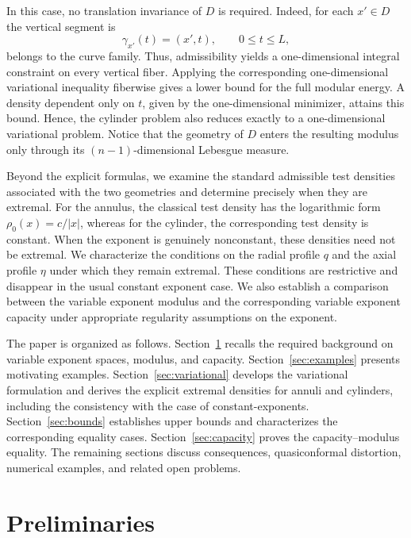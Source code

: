 \documentclass[12pt]{amsart}
\numberwithin{equation}{section}
\theoremstyle{plain}
\theoremstyle{definition}
\begin{document}
In this case, no translation invariance of $D$ is required. Indeed, for
each $x'\in D$ the vertical segment is
\begin{equation*}
\gamma_{x'}(t)=(x',t),
\qquad 0\le t\le L,
\end{equation*}
belongs to the curve family. Thus, admissibility yields a
one-dimensional integral constraint on every vertical fiber. Applying
the corresponding one-dimensional variational inequality fiberwise
gives a lower bound for the full modular energy. A density dependent
only on $t$, given by the one-dimensional minimizer, attains this
bound. Hence, the cylinder problem also reduces exactly to a
one-dimensional variational problem. Notice that the geometry of $D$
enters the resulting modulus only through its $(n-1)$-dimensional
Lebesgue measure.

Beyond the explicit formulas, we examine the standard admissible test
densities associated with the two geometries and determine precisely
when they are extremal. For the annulus, the classical test density has
the logarithmic form $\rho_0(x)=c/|x|$,
whereas for the cylinder, the corresponding test density is constant.
When the exponent is genuinely nonconstant, these densities need not
be extremal. We characterize the conditions on the radial profile $q$
and the axial profile $\eta$ under which they remain extremal. These
conditions are restrictive and disappear in the usual constant
exponent case. We also establish a comparison between the variable
exponent modulus and the corresponding variable exponent capacity
under appropriate regularity assumptions on the exponent.

The paper is organized as follows. Section~\ref{sec:prelim} recalls
the required background on variable exponent spaces, modulus, and
capacity. Section~\ref{sec:examples} presents motivating examples.
Section~\ref{sec:variational} develops the variational formulation and
derives the explicit extremal densities for annuli and cylinders,
including the consistency with the case of constant-exponents.
Section~\ref{sec:bounds} establishes upper bounds and characterizes
the corresponding equality cases. Section~\ref{sec:capacity} proves
the capacity--modulus equality. The remaining sections discuss
consequences, quasiconformal distortion, numerical examples, and
related open problems.

\section{Preliminaries}\label{sec:prelim}
\end{document}
